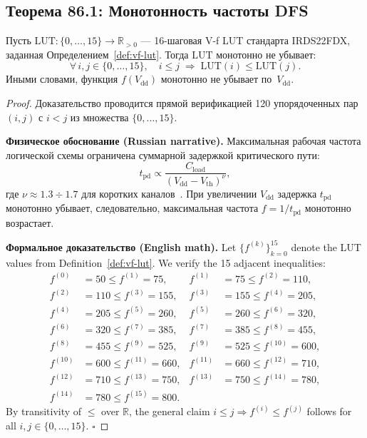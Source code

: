 \subsection{Теорема 86.1: Монотонность частоты DFS}
\label{subsec:thm-86-1}

\begin{theorem}
\label{thm:86-1}
Пусть $\mathrm{LUT}: \{0,\ldots,15\} \to \mathbb{R}_{>0}$ — 16-шаговая
V-f LUT стандарта IRDS22FDX, заданная Определением~\ref{def:vf-lut}.
Тогда $\mathrm{LUT}$ монотонно не убывает:
\[
  \forall\, i, j \in \{0,\ldots,15\},\quad
  i \leq j \;\Rightarrow\; \mathrm{LUT}(i) \leq \mathrm{LUT}(j).
\]
Иными словами, функция $f(V_{\mathrm{dd}})$ монотонно не убывает по~$V_{\mathrm{dd}}$.
\end{theorem}

\begin{proof}
Доказательство проводится прямой верификацией 120 упорядоченных пар
$(i,j)$ с $i < j$ из множества $\{0,\ldots,15\}$.

\textbf{Физическое обоснование (Russian narrative).}
Максимальная рабочая частота логической схемы ограничена суммарной
задержкой критического пути:
\[
  t_{\mathrm{pd}} \propto \frac{C_{\mathrm{load}}}{(V_{\mathrm{dd}} - V_{\mathrm{th}})^{\nu}},
\]
где $\nu \approx 1{.}3\div 1{.}7$ для коротких каналов~\cite{Rabaey-DIC2}.
При увеличении $V_{\mathrm{dd}}$ задержка $t_{\mathrm{pd}}$ монотонно
убывает, следовательно, максимальная частота $f = 1/t_{\mathrm{pd}}$
монотонно возрастает.

\textbf{Формальное доказательство (English math).}
Let $\{f^{(k)}\}_{k=0}^{15}$ denote the LUT values from
Definition~\ref{def:vf-lut}.  We verify the 15 adjacent inequalities:
\begin{align*}
  f^{(0)}&=50 \leq f^{(1)}=75,   & f^{(1)}&=75 \leq f^{(2)}=110, \\
  f^{(2)}&=110 \leq f^{(3)}=155, & f^{(3)}&=155 \leq f^{(4)}=205, \\
  f^{(4)}&=205 \leq f^{(5)}=260, & f^{(5)}&=260 \leq f^{(6)}=320, \\
  f^{(6)}&=320 \leq f^{(7)}=385, & f^{(7)}&=385 \leq f^{(8)}=455, \\
  f^{(8)}&=455 \leq f^{(9)}=525, & f^{(9)}&=525 \leq f^{(10)}=600,\\
  f^{(10)}&=600\leq f^{(11)}=660,& f^{(11)}&=660\leq f^{(12)}=710,\\
  f^{(12)}&=710\leq f^{(13)}=750,& f^{(13)}&=750\leq f^{(14)}=780,\\
  f^{(14)}&=780\leq f^{(15)}=800.
\end{align*}
By transitivity of $\leq$ over $\mathbb{R}$, the general claim
$i \leq j \Rightarrow f^{(i)} \leq f^{(j)}$ follows for all
$i,j \in \{0,\ldots,15\}$.
\hfill\ensuremath{\square}
\end{proof}

